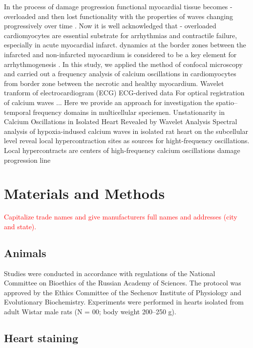 \documentclass{biophys-new}
\begin{document}
In the process of damage progression functional myocardial tissue becomes  -overloaded and then lost functionality with the properties of  waves changing progressively over time \cite{minamikawa1997situ,hama1998real}.
Now it is well acknowledged that  - overloaded cardiomyocytes are essential substrate for arrhythmias and contractile failure, especially in acute myocardial infarct.
 dynamics at the border zones between the infarcted and non-infarcted myocardium is considered to be a key element for arrhythmogenesis \cite{takamatsu2008arrhythmogenic}.
In this study, we applied the method of confocal microscopy and carried out a frequency analysis of calcium oscillations in cardiomyocytes from border zone between the necrotic and healthy myocardium.
Wavelet tranform of electrocardiogram (ECG)
ECG-derived data \cite{sharma2017use}
For optical registration of calcium waves \cite{matsuura2018intravital} ...
Here we provide an approach for investigation the spatio–temporal frequency domains in multicellular speciemen.
Unstationarity in Calcium Oscillations in Isolated Heart Revealed by Wavelet Analysis
Spectral analysis of hypoxia-indused calcium waves in isolated rat heart on the subcellular level reveal local hypercontraction sites as sources for hight-frequency oscillations.
Local hypercontracts are centers of high-frequency calcium oscillations
damage progression line

\section*{Materials and Methods}

\textcolor{red}{Capitalize trade names and give manufacturers full names and addresses (city and state).}

\subsection*{Animals}

Studies were conducted in accordance with regulations of the National Committee on Bioethics of the Russian Academy of Sciences.
The protocol was approved by the Ethics Committee of the Sechenov Institute of Physiology and Evolutionary Biochemistry.
Experiments were performed in hearts isolated from adult Wistar male rats (N = 00; body weight 200–250 g).

\subsection*{Heart staining}
\end{document}
